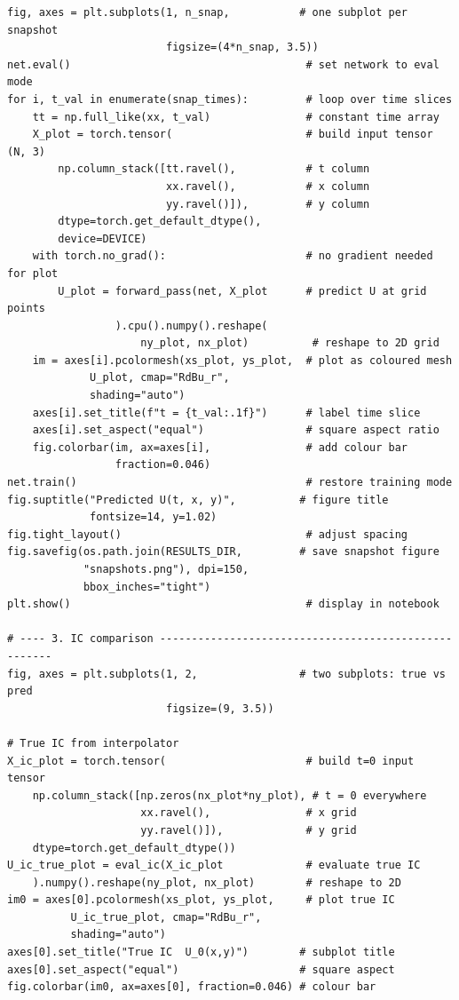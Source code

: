 \documentclass[11pt,a4paper]{article}
\begin{document}
\begin{lstlisting}
fig, axes = plt.subplots(1, n_snap,           # one subplot per snapshot
                         figsize=(4*n_snap, 3.5))
net.eval()                                     # set network to eval mode
for i, t_val in enumerate(snap_times):         # loop over time slices
    tt = np.full_like(xx, t_val)               # constant time array
    X_plot = torch.tensor(                     # build input tensor (N, 3)
        np.column_stack([tt.ravel(),           # t column
                         xx.ravel(),           # x column
                         yy.ravel()]),         # y column
        dtype=torch.get_default_dtype(),
        device=DEVICE)
    with torch.no_grad():                      # no gradient needed for plot
        U_plot = forward_pass(net, X_plot      # predict U at grid points
                 ).cpu().numpy().reshape(
                     ny_plot, nx_plot)          # reshape to 2D grid
    im = axes[i].pcolormesh(xs_plot, ys_plot,  # plot as coloured mesh
             U_plot, cmap="RdBu_r",
             shading="auto")
    axes[i].set_title(f"t = {t_val:.1f}")      # label time slice
    axes[i].set_aspect("equal")                # square aspect ratio
    fig.colorbar(im, ax=axes[i],               # add colour bar
                 fraction=0.046)
net.train()                                    # restore training mode
fig.suptitle("Predicted U(t, x, y)",          # figure title
             fontsize=14, y=1.02)
fig.tight_layout()                             # adjust spacing
fig.savefig(os.path.join(RESULTS_DIR,         # save snapshot figure
            "snapshots.png"), dpi=150,
            bbox_inches="tight")
plt.show()                                     # display in notebook

# ---- 3. IC comparison -----------------------------------------------------
fig, axes = plt.subplots(1, 2,                # two subplots: true vs pred
                         figsize=(9, 3.5))

# True IC from interpolator
X_ic_plot = torch.tensor(                      # build t=0 input tensor
    np.column_stack([np.zeros(nx_plot*ny_plot), # t = 0 everywhere
                     xx.ravel(),               # x grid
                     yy.ravel()]),             # y grid
    dtype=torch.get_default_dtype())
U_ic_true_plot = eval_ic(X_ic_plot             # evaluate true IC
    ).numpy().reshape(ny_plot, nx_plot)        # reshape to 2D
im0 = axes[0].pcolormesh(xs_plot, ys_plot,     # plot true IC
          U_ic_true_plot, cmap="RdBu_r",
          shading="auto")
axes[0].set_title("True IC  U_0(x,y)")        # subplot title
axes[0].set_aspect("equal")                   # square aspect
fig.colorbar(im0, ax=axes[0], fraction=0.046) # colour bar


\end{lstlisting}
\end{document}

